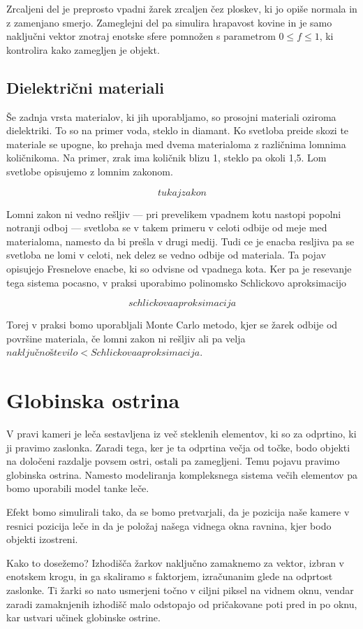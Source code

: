 \documentclass[12pt, a4paper]{article}
\begin{document}
Zrcaljeni del je preprosto vpadni žarek zrcaljen čez ploskev, ki jo opiše normala in z zamenjano smerjo.
Zameglejni del pa simulira hrapavost kovine in je samo naključni vektor znotraj enotske sfere pomnožen
s parametrom $0 \leq f \leq 1$, ki kontrolira kako zamegljen je objekt.

\subsection{Dielektrični materiali}
Še zadnja vrsta materialov, ki jih uporabljamo, so prosojni materiali oziroma dielektriki. To so na primer voda,
steklo in diamant. Ko svetloba preide skozi te materiale se upogne, ko prehaja med dvema materialoma z
različnima lomnima količnikoma. Na primer, zrak ima količnik blizu 1, steklo pa okoli 1,5. Lom svetlobe opisujemo
z lomnim zakonom.

$$
	tukaj zakon
$$


Lomni zakon ni vedno rešljiv — pri prevelikem vpadnem kotu nastopi popolni notranji odboj — svetloba se v takem
primeru v celoti odbije od meje med materialoma, namesto da bi prešla v drugi medij. Tudi ce je enacba resljiva
pa se svetloba ne lomi v celoti, nek delez se vedno odbije od materiala. Ta pojav opisujejo Fresnelove enacbe, ki
so odvisne od vpadnega kota. Ker pa je resevanje tega sistema pocasno, v praksi uporabimo polinomsko Schlickovo
aproksimacijo

$$
	schlickova aproksimacija
$$

Torej v praksi bomo uporabljali Monte Carlo metodo, kjer se žarek odbije od površine materiala, če lomni zakon
ni rešljiv ali pa velja $naključno število < Schlickova aproksimacija$.

\section{Globinska ostrina}

V pravi kameri je leča sestavljena iz več steklenih elementov, ki so za odprtino, ki ji pravimo zaslonka.
Zaradi tega, ker je ta odprtina večja od točke, bodo objekti na določeni razdalje povsem ostri, ostali pa
zamegljeni. Temu pojavu pravimo globinska ostrina. Namesto modeliranja kompleksnega sistema večih elementov
pa bomo uporabili model tanke leče.


Efekt bomo simulirali tako, da se bomo pretvarjali, da je pozicija naše kamere v resnici pozicija leče in
da je položaj našega vidnega okna ravnina, kjer bodo objekti izostreni.

Kako to dosežemo? Izhodišča žarkov naključno zamaknemo za vektor, izbran v enotskem krogu, in ga skaliramo s
faktorjem, izračunanim glede na odprtost zaslonke. Ti žarki so nato usmerjeni točno v ciljni piksel na vidnem
oknu, vendar zaradi zamaknjenih izhodišč malo odstopajo od pričakovane poti pred in po oknu, kar ustvari učinek
globinske ostrine.

\printbibliography
\end{document}
